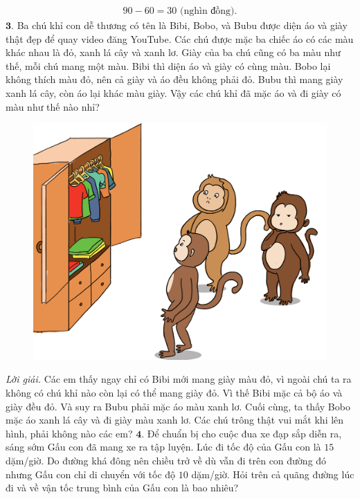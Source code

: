 \begin{multicols}{2}
	\begin{align*}
		90-60 = 30 \text{ (nghìn đồng).}
	\end{align*}
	$\pmb{3.}$ Ba chú khỉ con dễ thương có tên là Bibi, Bobo, và Bubu được diện áo và giày thật đẹp để quay video đăng YouTube. Các chú được mặc ba chiếc áo có các màu khác nhau là đỏ, xanh lá cây và xanh lơ. Giày của ba chú cũng có ba màu như thế, mỗi chú mang một màu. Bibi thì diện áo và giày có cùng màu. Bobo lại không thích màu đỏ, nên cả giày và áo đều không phải đỏ. Bubu thì mang giày xanh lá cây, còn áo lại khác màu giày. Vậy các chú khỉ đã mặc áo và đi giày có màu như thế nào nhỉ?
	\begin{figure}[H]
		\centering
		\vspace*{-5pt}
		\captionsetup{labelformat= empty, justification=centering}
		\includegraphics[width=1\linewidth]{bai3}
		\vspace*{-18pt}
	\end{figure}
	\textit{Lời giải.} Các em thấy ngay chỉ có Bibi mới mang giày màu đỏ, vì ngoài chú ta ra không có chú khỉ nào còn lại có thể mang giày đỏ. Vì thế Bibi mặc cả bộ áo và giày đều đỏ. Và suy ra Bubu phải mặc áo màu xanh lơ. Cuối cùng, ta thấy Bobo mặc áo xanh lá cây và đi giày màu xanh lơ. Các chú trông thật vui mắt khi lên hình, phải không nào các em?
	\vskip 0.1cm
	$\pmb{4.}$ Để chuẩn bị cho cuộc đua xe đạp sắp diễn ra, sáng sớm Gấu con đã mang xe ra tập luyện. Lúc đi tốc độ của Gấu con là $15$ dặm/giờ. Do đường khá đông nên chiều trở về dù vẫn đi trên con đường đó nhưng Gấu con chỉ di chuyển với tốc độ $10$ dặm/giờ. Hỏi trên cả quãng đường lúc đi và về vận tốc trung bình của Gấu con là bao nhiêu?

\end{multicols}
